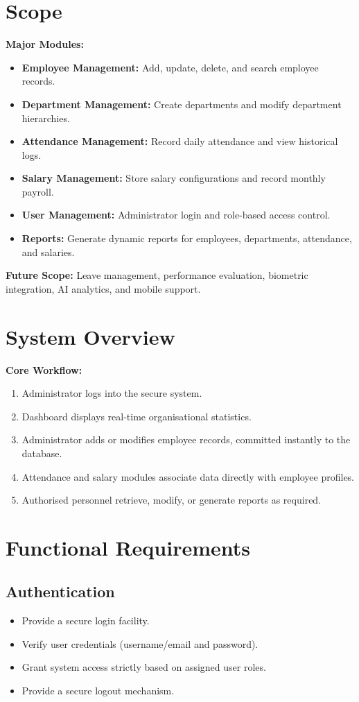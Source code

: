\documentclass[12pt,a4paper]{report}
\begin{document}
\section{Scope}
\textbf{Major Modules:}
\begin{itemize}
  \item \textbf{Employee Management:} Add, update, delete, and search employee records.
  \item \textbf{Department Management:} Create departments and modify department hierarchies.
  \item \textbf{Attendance Management:} Record daily attendance and view historical logs.
  \item \textbf{Salary Management:} Store salary configurations and record monthly payroll.
  \item \textbf{User Management:} Administrator login and role-based access control.
  \item \textbf{Reports:} Generate dynamic reports for employees, departments, attendance, and salaries.
\end{itemize}
\textbf{Future Scope:} Leave management, performance evaluation, biometric integration, AI analytics, and mobile support.

\section{System Overview}
\textbf{Core Workflow:}
\begin{enumerate}
  \item Administrator logs into the secure system.
  \item Dashboard displays real-time organisational statistics.
  \item Administrator adds or modifies employee records, committed instantly to the database.
  \item Attendance and salary modules associate data directly with employee profiles.
  \item Authorised personnel retrieve, modify, or generate reports as required.
\end{enumerate}

\section{Functional Requirements}

\subsection{Authentication}
\begin{itemize}
  \item Provide a secure login facility.
  \item Verify user credentials (username/email and password).
  \item Grant system access strictly based on assigned user roles.
  \item Provide a secure logout mechanism.
\end{itemize}
\end{document}
